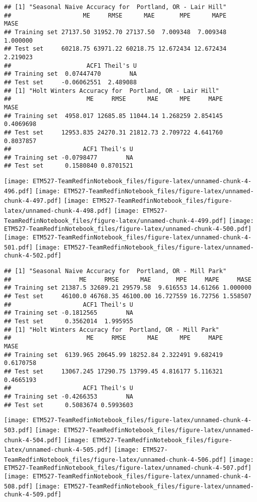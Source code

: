 \documentclass[]{article}
\begin{document}
\begin{verbatim}
## [1] "Seasonal Naive Accuracy for  Portland, OR - Lair Hill"
##                    ME     RMSE      MAE       MPE      MAPE     MASE
## Training set 27137.50 31952.70 27137.50  7.009348  7.009348 1.000000
## Test set     60218.75 63971.22 60218.75 12.672434 12.672434 2.219023
##                     ACF1 Theil's U
## Training set  0.07447470        NA
## Test set     -0.06062551  2.489088
## [1] "Holt Winters Accuracy for  Portland, OR - Lair Hill"
##                     ME     RMSE      MAE      MPE     MAPE      MASE
## Training set  4958.017 12685.85 11044.14 1.268259 2.854145 0.4069698
## Test set     12953.835 24270.31 21812.73 2.709722 4.641760 0.8037857
##                    ACF1 Theil's U
## Training set -0.0798477        NA
## Test set      0.1580840 0.8701521
\end{verbatim}

\texttt{[image: ETM527-TeamRedfinNotebook\_files/figure-latex/unnamed-chunk-4-496.pdf]}
\texttt{[image: ETM527-TeamRedfinNotebook\_files/figure-latex/unnamed-chunk-4-497.pdf]}
\texttt{[image: ETM527-TeamRedfinNotebook\_files/figure-latex/unnamed-chunk-4-498.pdf]}
\texttt{[image: ETM527-TeamRedfinNotebook\_files/figure-latex/unnamed-chunk-4-499.pdf]}
\texttt{[image: ETM527-TeamRedfinNotebook\_files/figure-latex/unnamed-chunk-4-500.pdf]}
\texttt{[image: ETM527-TeamRedfinNotebook\_files/figure-latex/unnamed-chunk-4-501.pdf]}
\texttt{[image: ETM527-TeamRedfinNotebook\_files/figure-latex/unnamed-chunk-4-502.pdf]}

\begin{verbatim}
## [1] "Seasonal Naive Accuracy for  Portland, OR - Mill Park"
##                   ME     RMSE      MAE       MPE     MAPE     MASE
## Training set 21387.5 32689.21 29579.58  9.616553 14.61266 1.000000
## Test set     46100.0 46768.35 46100.00 16.727559 16.72756 1.558507
##                    ACF1 Theil's U
## Training set -0.1812565        NA
## Test set      0.3562014  1.995955
## [1] "Holt Winters Accuracy for  Portland, OR - Mill Park"
##                     ME     RMSE      MAE      MPE     MAPE      MASE
## Training set  6139.965 20645.99 18252.84 2.322491 9.682419 0.6170758
## Test set     13067.245 17290.75 13799.45 4.816177 5.116321 0.4665193
##                    ACF1 Theil's U
## Training set -0.4266353        NA
## Test set      0.5083674 0.5993603
\end{verbatim}

\texttt{[image: ETM527-TeamRedfinNotebook\_files/figure-latex/unnamed-chunk-4-503.pdf]}
\texttt{[image: ETM527-TeamRedfinNotebook\_files/figure-latex/unnamed-chunk-4-504.pdf]}
\texttt{[image: ETM527-TeamRedfinNotebook\_files/figure-latex/unnamed-chunk-4-505.pdf]}
\texttt{[image: ETM527-TeamRedfinNotebook\_files/figure-latex/unnamed-chunk-4-506.pdf]}
\texttt{[image: ETM527-TeamRedfinNotebook\_files/figure-latex/unnamed-chunk-4-507.pdf]}
\texttt{[image: ETM527-TeamRedfinNotebook\_files/figure-latex/unnamed-chunk-4-508.pdf]}
\texttt{[image: ETM527-TeamRedfinNotebook\_files/figure-latex/unnamed-chunk-4-509.pdf]}
\end{document}

